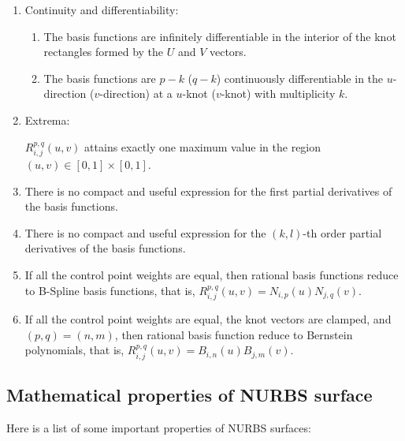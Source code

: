 \begin{enumerate}
    \item Continuity and differentiability:
    \begin{enumerate}
        \item The basis functions are infinitely differentiable in the interior of the knot rectangles formed by the $U$ and $V$ vectors.
        \item The basis functions are $p-k$ ($q-k$) continuously differentiable in the $u$-direction ($v$-direction) at a $u$-knot ($v$-knot) with multiplicity $k$.
    \end{enumerate}

    \item Extrema:
    
    $R_{i,j}^{p, q}(u, v)$ attains exactly one maximum value in the region $(u,v) \in [0, 1] \times [0, 1]$.
    
    \item There is no compact and useful expression for the first partial derivatives of the basis functions.
    
    \item There is no compact and useful expression for the $(k,l)$-th order partial derivatives of the basis functions.
    
    \item If all the control point weights are equal, then rational basis functions reduce to B-Spline basis functions, that is, $R_{i,j}^{p, q}(u, v)=N_{i,p}(u)N_{j,q}(v)$.
    
    \item If all the control point weights are equal, the knot vectors are clamped, and $(p,q)=(n,m)$, then rational basis function reduce to Bernstein polynomials, that is, $R_{i,j}^{p, q}(u, v)=B_{i,n}(u)B_{j,m}(v)$.
    
\end{enumerate}



\subsection{Mathematical properties of NURBS surface}
Here is a list of some important properties of NURBS surfaces:

